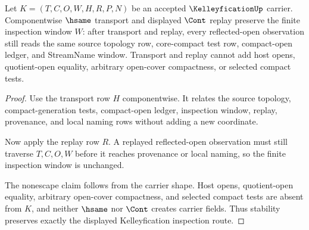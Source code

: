 \begin{theorem}
\label{thm:kelleyfication-inspection-window-stability}
Let $K=(T,C,O,W,H,R,P,N)$ be an accepted $\KelleyficationUp$ carrier. Componentwise $\hsame$ transport and displayed $\Cont$ replay preserve the finite inspection window $W$: after transport and replay, every reflected-open observation still reads the same source topology row, core-compact test row, compact-open ledger, and StreamName window. Transport and replay cannot add host opens, quotient-open equality, arbitrary open-cover compactness, or selected compact tests.
\end{theorem}
\begin{proof}
Use the transport row $H$ componentwise. It relates the source topology, compact-generation tests, compact-open ledger, inspection window, replay, provenance, and local naming rows without adding a new coordinate.

Now apply the replay row $R$. A replayed reflected-open observation must still traverse $T,C,O,W$ before it reaches provenance or local naming, so the finite inspection window is unchanged.

The nonescape claim follows from the carrier shape. Host opens, quotient-open equality, arbitrary open-cover compactness, and selected compact tests are absent from $K$, and neither $\hsame$ nor $\Cont$ creates carrier fields. Thus stability preserves exactly the displayed Kelleyfication inspection route.
\end{proof}

